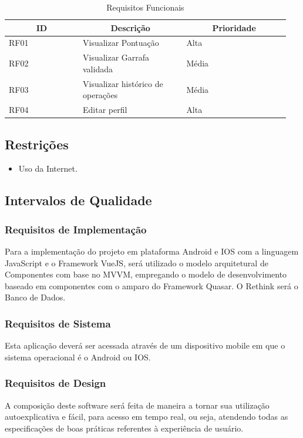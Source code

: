 \begin{table}[htp]
    \centering
    \caption{Requisitos Funcionais}
    \label{my-label}
    \begin{tabular}{|p{0.25\linewidth}|p{0.35\linewidth}|p{0.35\linewidth}|}
        \hline
        \multicolumn{1}{|c|}{\textbf{ID}} & \multicolumn{1}{c|}{\textbf{Descrição}} & \multicolumn{1}{c|}{\textbf{Prioridade}} \\ \hline
        RF01 & Visualizar Pontuação & Alta \\ \hline
        RF02 & Visualizar Garrafa validada & Média \\ \hline
        RF03 & Visualizar histórico de operações & Média \\ \hline
        RF04 & Editar perfil & Alta \\ \hline
    \end{tabular}
\end{table}

\subsection{Restrições}

\begin{itemize}
    \item Uso da Internet.
\end{itemize}

\subsection{Intervalos de Qualidade}

\subsubsection{Requisitos de Implementação}
Para a implementação do projeto em plataforma Android e IOS com a linguagem JavaScript e o Framework VueJS, será utilizado o modelo arquitetural de Componentes com base no MVVM, empregando o modelo de desenvolvimento baseado em componentes com o amparo do Framework Quasar. O Rethink será o Banco de Dados.

\subsubsection{Requisitos de Sistema}
Esta aplicação deverá ser acessada através de um dispositivo mobile em que o sistema operacional é o Android ou IOS.

\subsubsection{Requisitos de Design}
A composição deste software será feita de maneira a tornar sua utilização autoexplicativa e fácil, para acesso em tempo real, ou seja, atendendo todas as especificações de boas práticas referentes à experiência de usuário.

